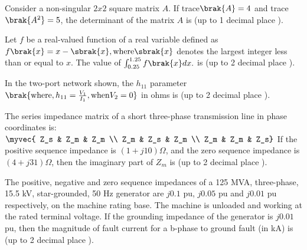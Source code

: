 \iffalse
\chapter{2018}
\author{AI24BTECH11033}
\section{me}
\fi

\item Consider a non-singular $2x2$ square matrix $A$. If trace$\brak{A} = 4$ and trace$\brak{A^2} = 5$, the determinant of the matrix $A$ is \underline{\hspace{1cm}} (up to 1 decimal place ).
\item Let $f$ be a real-valued function of a real variable defined as $f\brak{x} = x - \sbrak{x}, \text{where} \sbrak{x}$ denotes the largest integer less than or equal to $x$. The value of $\int_{0.25}^{1.25} f\brak{x} dx.$ is \underline{\hspace{1cm}} (up to 2 decimal place ).
\item In the two-port network shown, the $h_{11}$ parameter $\brak{\text{where}, h_{11} = \frac{V_1}{I_1}, \text{when} V_2 = 0}$ in ohms is \underline{\hspace{1cm}} (up to 2 decimal place ).
\begin{figure}[!ht]
    \centering
    \label{fig:power system network}
    \end{figure}
\item The series impedance matrix of a short three-phase transmission line in phase coordinates is:
$\myvec{
Z_s & Z_m & Z_m \\
Z_m & Z_s & Z_m \\
Z_m & Z_m & Z_s}$
If the positive sequence impedance is $(1 + j10) \Omega$, and the zero sequence impedance is $(4 + j31) \Omega$, then the imaginary part of $Z_m$ is \underline{\hspace{1cm}} (up to 2 decimal place ).
\item The positive, negative and zero sequence impedances of a 125 MVA, three-phase, 15.5 kV, star-grounded, 50 Hz generator are $j0.1$ pu, $j0.05$ pu and $j0.01$ pu respectively, on the machine rating base. The machine is unloaded and working at the rated terminal voltage. If the grounding impedance of the generator is $j0.01$ pu, then the magnitude of fault current for a b-phase to ground fault (in kA) is \underline{\hspace{1cm}} (up to 2 decimal place ). 
